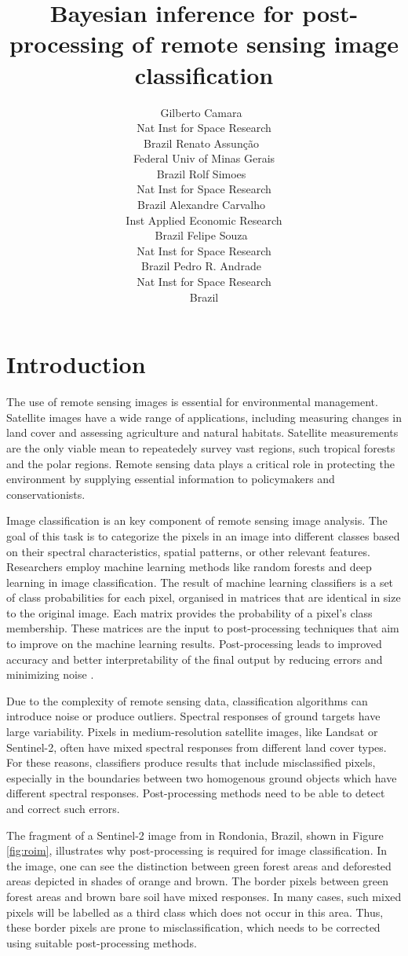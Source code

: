 \documentclass[
  shortnames]{jss}
\author{
Gilberto Camara~\orcidlink{0000-0002-3681-487X}\\Nat Inst for Space Research\\
Brazil \And Renato Assunção~\orcidlink{0000-0001-7442-9166}\\Federal Univ of Minas Gerais\\
Brazil \And Rolf Simoes~\orcidlink{0000-0003-0953-4132}\\Nat Inst for Space Research\\
Brazil \AND Alexandre Carvalho~\orcidlink{0000-0001-8762-5465}\\Inst Applied Economic Research\\
Brazil \And Felipe Souza~\orcidlink{0000-XXXXX}\\Nat Inst for Space Research\\
Brazil \And Pedro R. Andrade~\orcidlink{0000-0001-8675-4046}\\Nat Inst for Space Research\\
Brazil
}
\title{Bayesian inference for post-processing of remote sensing image classification}
\begin{document}
\newpage

\hypertarget{introduction}{%
\section{Introduction}\label{introduction}}

The use of remote sensing images is essential for environmental management. Satellite images have a wide range of applications, including measuring changes in land cover and assessing agriculture and natural habitats. Satellite measurements are the only viable mean to repeatedely survey vast regions, such tropical forests and the polar regions. Remote sensing data plays a critical role in protecting the environment by supplying essential information to policymakers and conservationists.

Image classification is an key component of remote sensing image analysis. The goal of this task is to categorize the pixels in an image into different classes based on their spectral characteristics, spatial patterns, or other relevant features. Researchers employ machine learning methods like random forests \citep{Belgiu2016} and deep learning \citep{Ma2019} in image classification. The result of machine learning classifiers is a set of class probabilities for each pixel, organised in matrices that are identical in size to the original image. Each matrix provides the probability of a pixel's class membership. These matrices are the input to post-processing techniques that aim to improve on the machine learning results. Post-processing leads to improved accuracy and better interpretability of the final output by reducing errors and minimizing noise \citep{Schindler2012}.

Due to the complexity of remote sensing data, classification algorithms can introduce noise or produce outliers. Spectral responses of ground targets have large variability. Pixels in medium-resolution satellite images, like Landsat or Sentinel-2, often have mixed spectral responses from different land cover types. For these reasons, classifiers produce results that include misclassified pixels, especially in the boundaries between two homogenous ground objects which have different spectral responses. Post-processing methods need to be able to detect and correct such errors.

The fragment of a Sentinel-2 image from in Rondonia, Brazil, shown in Figure \ref{fig:roim}, illustrates why post-processing is required for image classification. In the image, one can see the distinction between green forest areas and deforested areas depicted in shades of orange and brown. The border pixels between green forest areas and brown bare soil have mixed responses. In many cases, such mixed pixels will be labelled as a third class which does not occur in this area. Thus, these border pixels are prone to misclassification, which needs to be corrected using suitable post-processing methods.
\end{document}
